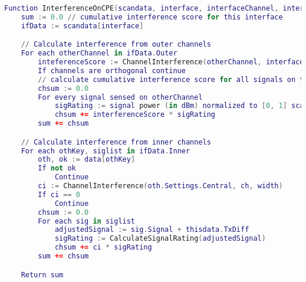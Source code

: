\begin{lstlisting}[language={Lua}, caption=InterferenceOnCPE() function, label=lst:interf_on_cpe]
Function InterferenceOnCPE(scandata, interface, interfaceChannel, interfaceChannelWidth)
    sum := 0.0 // cumulative interference score for this interface
    ifData := scandata[interface]

    // Calculate interference from outer channels
    For each otherChannel in ifData.Outer
        inteferenceScore := ChannelInterference(otherChannel, interfaceChannel, interfaceChannelWidth)
        If channels are orthogonal continue
        // calculate cumulative interference score for all signals on this channel
        chsum := 0.0
        For every signal sensed on otherChannel
            sigRating := signal power (in dBm) normalized to [0, 1] scale
            chsum += interferenceScore * sigRating
        sum += chsum

    // Calculate interference from inner channels
    For each othKey, siglist in ifData.Inner
        oth, ok := data[othKey]
        If not ok
            Continue
        ci := ChannelInterference(oth.Settings.Central, ch, width)
        If ci == 0
            Continue
        chsum := 0.0
        For each sig in siglist
            adjustedSignal := sig.Signal + thisdata.TxDiff
            sigRating := CalculateSignalRating(adjustedSignal)
            chsum += ci * sigRating
        sum += chsum

    Return sum
\end{lstlisting}



